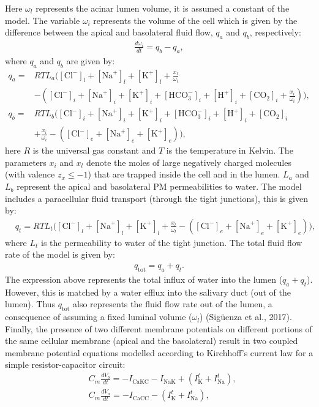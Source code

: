 \documentclass{svjour3}
\begin{document}
Here $\omega_l$ represents the acinar lumen volume, it is assumed a constant of the model. The variable $\omega_i$ represents the volume of the cell which is given by the difference between the apical and basolateral fluid flow, $q_a$ and $q_b$, respectively:
\begin{align*}
\frac{d \omega_i}{dt}=q_b-q_a,
\end{align*}
where $q_a$ and $q_b$ are given by:
\begin{align*}
q_a=& RTL_a \Bigg( [\text{Cl}^-]_l+[\text{Na}^+]_l+[\text{K}^+]_l + \frac{x_l}{\omega_l} \\
& - \left( [\text{Cl}^-]_i+[\text{Na}^+]_i+[\text{K}^+]_i+[\text{HCO}_3^-]_i+[\text{H}^+]_i+[\text{CO}_2]_i+\frac{x_i}{\omega_i} \right) \Bigg),  \nonumber \\
q_b=& RTL_b \Bigg( [\text{Cl}^-]_i+[\text{Na}^+]_i+[\text{K}^+]_i+[\text{HCO}_3^-]_i+[\text{H}^+]_i+[\text{CO}_2]_i \\
& +\frac{x_i}{\omega_i} - \left( [\text{Cl}^-]_e+[\text{Na}^+]_e+[\text{K}^+]_e \right) \Bigg), \nonumber
\end{align*}
here $R$ is the universal gas constant and $T$ is the temperature in Kelvin. The parameters $x_i$ and $x_l$ denote the moles of large negatively charged molecules (with valence $z_x \leq -1$) that are trapped inside the cell and in the lumen. $L_a$ and $L_b$ represent the apical and basolateral PM permeabilities to water. The model includes a paracellular fluid transport (through the tight junctions), this is given by:
\begin{align*}
&q_t= RTL_t \Bigg([\text{Cl}^-]_l+[\text{Na}^+]_l+[\text{K}^+]_l+\frac{x_l}{\omega_l}- \left( [\text{Cl}^-]_e+[\text{Na}^+]_e+[\text{K}^+]_e \right) \Bigg), 
\end{align*}
where $L_t$ is the permeability to water of the tight junction. The total fluid flow rate of the model is given by:
\begin{align*}
q_{\text{tot}}=q_a+q_t.
\end{align*}
The expression above represents the total influx of water into the lumen ($q_a + q_t$). However, this is matched by a water efflux into the salivary duct (out of the lumen). Thus $q_{\text{tot}}$ also represents the fluid flow rate out of the lumen, a consequence of assuming a fixed luminal volume ($\omega_l$) (Sig{\"u}enza et al., 2017). \\

Finally, the presence of two different membrane potentials on different portions of the same cellular membrane (apical and the basolateral) result in two coupled membrane potential equations modelled according to Kirchhoff's current law for a simple resistor-capacitor circuit:
\begin{align*}
	&C_m \frac{dV_b}{dt}=-I_{\text{CaKC}}-I_{\text{NaK}}+(I_\text{K}^t+I_{\text{Na}}^t),\\
	&C_m \frac{dV_a}{dt}=-I_{\text{CaCC}}-(I_\text{K}^t+I_{\text{Na}}^t),
\end{align*}
\end{document}
